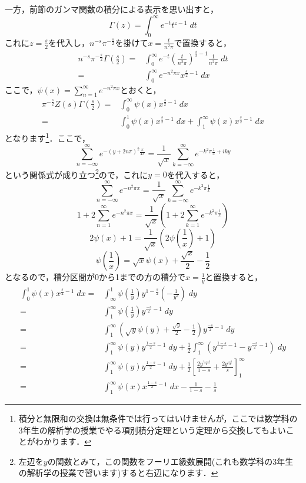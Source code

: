 \documentclass[./main]{subfile}
\begin{document}
一方，前節のガンマ関数の積分による表示を思い出すと，
\[
\Gamma(z)=\int_0^{\infty}e^{-t}t^{z-1}\;dt
\]
これに$z=\frac{s}{2}$を代入し，$n^{-s}\pi^{-\frac{s}{2}}$を掛けて$x=\frac{t}{n^2\pi}$で置換すると，
\begin{align*}
n^{-s}\pi^{-\frac{s}{2}}\Gamma\left(\frac{s}{2}\right)=&\int_0^{\infty}e^{-t}\left(\frac{t}{n^2\pi}\right)^{\frac{s}{2}-1}\frac{1}{n^2\pi}\;dt\\
=&\int_0^{\infty}e^{-n^2\pi x}x^{\frac{s}{2}-1}\;dx
\end{align*}
ここで，$\psi(x)=\sum_{n=1}^{\infty}e^{-n^2\pi x}$とおくと，
\begin{align*}
\pi^{-\frac{s}{2}}Z(s)\Gamma\left(\frac{s}{2}\right)=&\int_0^{\infty}\psi(x)x^{\frac{s}{2}-1}\;dx\\
=&\int_0^1\psi(x)x^{\frac{s}{2}-1}\;dx+\int_1^{\infty}\psi(x)x^{\frac{s}{2}-1}\;dx
\end{align*}
となります\footnote{積分と無限和の交換は無条件では行ってはいけませんが，ここでは数学科の3年生の解析学の授業でやる項別積分定理という定理から交換してもよいことがわかります．}．ここで，
\[
\sum_{n=-\infty}^{\infty}e^{-(y+2n\pi)^2\frac{x}{4\pi}}=\frac{1}{\sqrt{x}}\sum_{k=-\infty}^{\infty}e^{-k^2\pi\frac{1}{x}+iky}
\]
という関係式が成り立つ\footnote{左辺を$y$の関数とみて，この関数をフーリエ級数展開(これも数学科の3年生の解析学の授業で習います)すると右辺になります．}ので，これに$y=0$を代入すると，
\[
\sum_{n=-\infty}^{\infty}e^{-n^2\pi x}=\frac{1}{\sqrt{x}}\sum_{k=-\infty}^{\infty}e^{-k^2\pi\frac{1}{x}}
\]
\[
1+2\sum_{n=1}^{\infty}e^{-n^2\pi x}=\frac{1}{\sqrt{x}}\left(1+2\sum_{k=1}^{\infty}e^{-k^2\pi\frac{1}{x}}\right)
\]
\[
2\psi(x)+1=\frac{1}{\sqrt{x}}\left(2\psi\left(\frac{1}{x}\right)+1\right)
\]
\[
\psi\left(\frac{1}{x}\right)=\sqrt{x}\psi(x)+\frac{\sqrt{x}}{2}-\frac{1}{2}
\]
となるので，積分区間が0から1までの方の積分で$x=\frac{1}{y}$と置換すると，
\begin{align*}
\int_0^1\psi(x)x^{\frac{s}{2}-1}\;dx=&\int_{\infty}^1\psi\left(\frac{1}{y}\right)y^{1-\frac{s}{2}}\left(-\frac{1}{y^2}\right)\;dy\\
=&\int_1^{\infty}\psi\left(\frac{1}{y}\right)y^{\frac{-s}{2}-1}\;dy\\
=&\int_1^{\infty}\left(\sqrt{y}\psi(y)+\frac{\sqrt{y}}{2}-\frac{1}{2}\right)y^{\frac{-s}{2}-1}\;dy\\
=&\int_1^{\infty}\psi(y)y^{\frac{1-s}{2}-1}\;dy+\frac{1}{2}\int_1^{\infty}\left(y^{\frac{1-s}{2}-1}-y^{\frac{-s}{2}-1}\right)\;dy\\
=&\int_1^{\infty}\psi(y)y^{\frac{1-s}{2}-1}\;dy+\frac{1}{2}\left[\frac{2y^{\frac{1-s}{2}}}{1-s}+\frac{2y^{\frac{-s}{2}}}{s}\right]_1^{\infty}\\
=&\int_1^{\infty}\psi(x)x^{\frac{1-s}{2}-1}\;dx-\frac{1}{1-s}-\frac{1}{s}
\end{align*}
\end{document}
